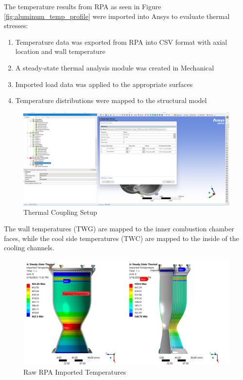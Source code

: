 The temperature results from RPA as seen in Figure \ref{fig:aluminum_temp_profile} were imported into Ansys to evaluate thermal stresses:
\begin{enumerate}
    \item Temperature data was exported from RPA into CSV format with axial location and wall temperature
    \item A steady-state thermal analysis module was created in Mechanical
    \item Imported load data was applied to the appropriate surfaces
    \item Temperature distributions were mapped to the structural model
\end{enumerate}
\begin{figure}
    \centering
    \includegraphics[width=1\linewidth]{Images/ThermalCouplingsetup.png}
    \caption{Thermal Coupling Setup}
    \label{fig:Thermal Coupling Setup}
\end{figure}
The wall temperatures (TWG) are mapped to the inner combustion chamber faces, while the cool side temperatures (TWC) are mapped to the inside of the cooling channels. 
\begin{figure}
    \centering
    \includegraphics[width=1\linewidth]{Images/Raw RPA Imported Temperatures.png}
    \caption{Raw RPA Imported Temperatures}
    \label{fig:Raw RPA Imported Temperatures}
\end{figure}

